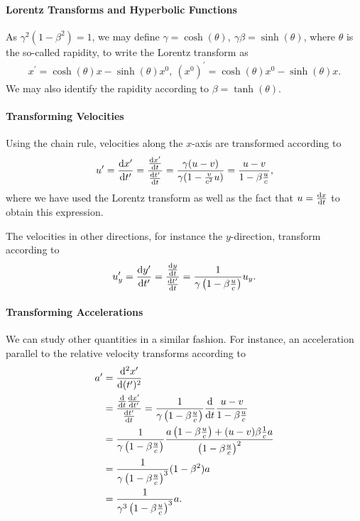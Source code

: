 \paragraph{Lorentz Transforms and Hyperbolic Functions}
As $\gamma^{2}(1 - \beta^{2}) = 1$, we may define $\gamma = \cosh(\theta),\ \gamma\beta = \sinh(\theta)$, where $\theta$ is the so-called rapidity, to write the Lorentz transform as
\begin{align*}
	x^{\prime} = \cosh(\theta)x - \sinh(\theta)x^{0},\ (x^{0})^{\prime} = \cosh(\theta)x^{0} - \sinh(\theta)x.
\end{align*}
We may also identify the rapidity according to $\beta = \tanh(\theta)$.

\paragraph{Transforming Velocities}
Using the chain rule, velocities along the $x$-axis are transformed according to
\begin{align*}
	u' = \dv{x'}{t'} = \frac{\dv{x'}{t}}{\dv{t'}{t}} = \frac{\gamma(u - v)}{\gamma(1 - \frac{v}{c^{2}}u)} = \frac{u - v}{1 - \beta\frac{u}{c}},
\end{align*}
where we have used the Lorentz transform as well as the fact that $u = \dv{x}{t}$ to obtain this expression.

The velocities in other directions, for instance the $y$-direction, transform according to
\begin{align*}
	u_{y}' = \dv{y'}{t'} = \frac{\dv{y}{t}}{\dv{t'}{t}} = \frac{1}{\gamma\left(1 - \beta\frac{u}{c}\right)}u_{y}.
\end{align*}

\paragraph{Transforming Accelerations}
We can study other quantities in a similar fashion. For instance, an acceleration parallel to the relative velocity transforms according to
\begin{align*}
	a^{\prime} &= \dv[2]{x^{\prime}}{(t^{\prime})} \\
	    &= \frac{\dv{t}\dv{x^{\prime}}{t^{\prime}}}{\dv{t^{\prime}}{t}} = \frac{1}{\gamma\left(1 - \beta\frac{u}{c}\right)}\dv{t}\frac{u - v}{1 - \beta\frac{u}{c}} \\
	    &= \frac{1}{\gamma\left(1 - \beta\frac{u}{c}\right)}\frac{a\left(1 - \beta\frac{u}{c}\right) + (u - v)\beta\frac{1}{c}a}{\left(1 - \beta\frac{u}{c}\right)^{2}} \\
	    &= \frac{1}{\gamma\left(1 - \beta\frac{u}{c}\right)^{3}}(1 - \beta^{2})a \\
	    &= \frac{1}{\gamma^{3}\left(1 - \beta\frac{u}{c}\right)^{3}}a.
\end{align*}

